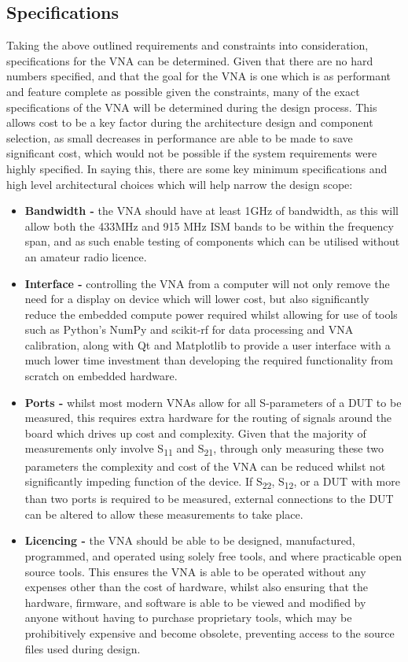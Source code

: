 \subsection{Specifications}
\label{subsec:specifications}
Taking the above outlined requirements and constraints into consideration, specifications for the VNA can be determined. Given that there are no hard numbers specified, and that the goal for the VNA is one which is as performant and feature complete as possible given the constraints, many of the exact specifications of the VNA will be determined during the design process. This allows cost to be a key factor during the architecture design and component selection, as small decreases in performance are able to be made to save significant cost, which would not be possible if the system requirements were highly specified. In saying this, there are some key minimum specifications and high level architectural choices which will help narrow the design scope:
\begin{itemize}
	\item \textbf{Bandwidth -} the VNA should have at least 1GHz of bandwidth, as this will allow both the 433MHz and 915 MHz ISM bands to be within the frequency span, and as such enable testing of components which can be utilised without an amateur radio licence. 
	\item \textbf{Interface -} controlling the VNA from a computer will not only remove the need for a display on device which will lower cost, but also significantly reduce the embedded compute power required whilst allowing for use of tools such as Python's NumPy and scikit-rf for data processing and VNA calibration, along with Qt and Matplotlib to provide a user interface with a much lower time investment than developing the required functionality from scratch on embedded hardware. 
	\item \textbf{Ports -} whilst most modern VNAs allow for all S-parameters of a DUT to be measured, this requires extra hardware for the routing of signals around the board which drives up cost and complexity. Given that the majority of measurements only involve S\textsubscript{11} and S\textsubscript{21}, through only measuring these two parameters the complexity and cost of the VNA can be reduced whilst not significantly impeding function of the device. If S\textsubscript{22}, S\textsubscript{12}, or a DUT with more than two ports is required to be measured, external connections to the DUT can be altered to allow these measurements to take place.  
	\item \textbf{Licencing -} the VNA should be able to be designed, manufactured, programmed, and operated using solely free tools, and where practicable open source tools. This ensures the VNA is able to be operated without any expenses other than the cost of hardware, whilst also ensuring that the hardware, firmware, and software is able to be viewed and modified by anyone without having to purchase proprietary tools, which may be prohibitively expensive and become obsolete, preventing access to the source files used during design. 
\end{itemize}